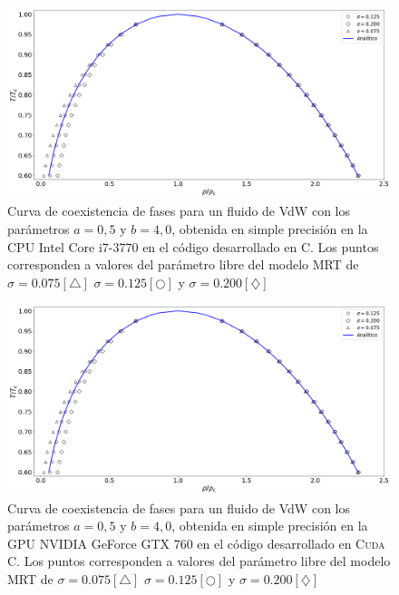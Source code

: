 \begin{figure}[h!]
	\centering
	\includegraphics[width=\textwidth]{figs/cap4/v_760_MxC_c_simple}
	\caption{Curva de coexistencia de fases para un fluido de VdW con los parámetros $a = 0,5 $ y $b = 4,0 $, obtenida en simple precisión en la CPU Intel Core i7-3770 en el código desarrollado en \textsc{C}. Los puntos corresponden a valores del parámetro libre del modelo MRT de $\sigma = 0.075[\bigtriangleup]$	 $\sigma = 0.125[\bigcirc]$ y $\sigma = 0.200[\diamondsuit]$ }
 	\label{fig:v_760_MxC_c_simple}	
\end{figure}

\begin{figure}[h!]
	\centering
	\includegraphics[width=\textwidth]{figs/cap4/v_760_MxC_cuda_simple}
	\caption{Curva de coexistencia de fases para un fluido de VdW con los parámetros $a = 0,5 $ y $b = 4,0 $, obtenida en simple precisión en la GPU NVIDIA GeForce GTX 760 en el código desarrollado en \textsc{Cuda C}. Los puntos corresponden a valores del parámetro libre del modelo MRT de $\sigma = 0.075[\bigtriangleup]$	 $\sigma = 0.125[\bigcirc]$ y $\sigma = 0.200[\diamondsuit]$ }
	\label{fig:v_760_MxC_cuda_simple}	
\end{figure}



